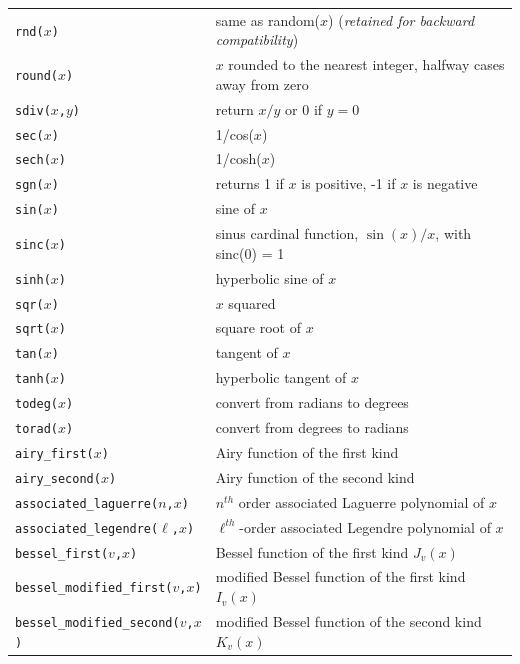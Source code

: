 \begin{supertabular}{lp{10cm}}
  {\tt rnd($x$)}  & same as random($x$) ({\it retained for backward compatibility}) \\
  {\tt round($x$)}  & $x$ rounded to the nearest integer, halfway cases away from zero \\
  {\tt sdiv($x$,$y$)}  & return $x/y$ or 0 if $y=0$ \\
  {\tt sec($x$)}  & 1/cos($x$) \\
  {\tt sech($x$)}  & 1/cosh($x$) \\
  {\tt sgn($x$)}  & returns 1 if $x$ is positive, -1 if $x$ is negative \\
  {\tt sin($x$)}  & sine of $x$ \\
  {\tt sinc($x$)}  & sinus cardinal function, $\sin(x)/x$, with sinc(0) = 1 \\
  {\tt sinh($x$)}  & hyperbolic sine of $x$ \\
  {\tt sqr($x$)}  & $x$ squared \\
  {\tt sqrt($x$)}  & square root of $x$ \\
  {\tt tan($x$)}  & tangent of $x$ \\
  {\tt tanh($x$)}  & hyperbolic tangent of $x$ \\
  {\tt todeg($x$)}  & convert from radians to degrees \\
  {\tt torad($x$)}  & convert from degrees to radians \\
  {\tt airy\_first($x$)}  & Airy function of the first kind \\
  {\tt airy\_second($x$)}  & Airy function of the second kind \\
  {\tt associated\_laguerre($n$,$x$)}  & $n^{th}$ order associated Laguerre polynomial of $x$ \\
  {\tt associated\_legendre($\ell$,$x$)}  & $\ell^{th}$-order associated Legendre polynomial of $x$ \\
  {\tt bessel\_first($v$,$x$)}  & Bessel function of the first kind $J_v(x)$ \\
  {\tt bessel\_modified\_first($v$,$x$)}  & modified Bessel function of the first kind $I_v(x)$ \\
  {\tt bessel\_modified\_second($v$,$x$)}  & modified Bessel function of the second kind $K_v(x)$ \\

\end{supertabular}
